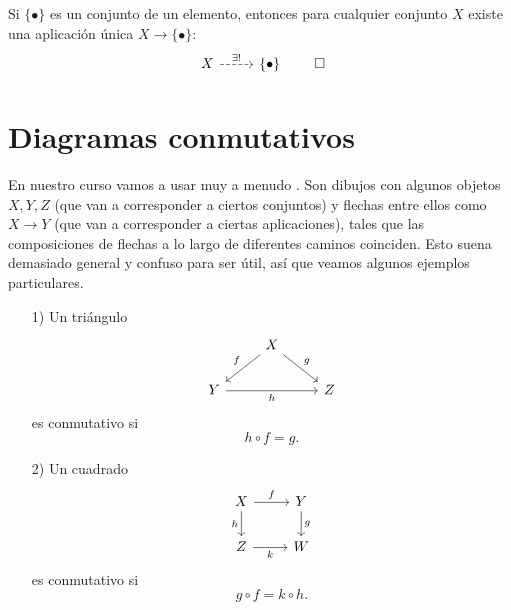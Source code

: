\begin{observacionejerc}
  \label{obs:propiedad-universal-de-singleton}
  Si $\{ \bullet \}$ es un conjunto de un elemento, entonces para cualquier
  conjunto $X$ existe una aplicación única $X \to \{ \bullet \}$:
  \[ \begin{tikzcd}
      X \ar[dashed]{r}{\exists !} & \{ \bullet \}
    \end{tikzcd} \qedhere \]
\end{observacionejerc}


\section{Diagramas conmutativos}

En nuestro curso vamos a usar muy a menudo .
Son dibujos con algunos objetos $X,Y,Z$ (que van a corresponder a ciertos
conjuntos) y flechas entre ellos como $X \to Y$ (que van a corresponder
a ciertas aplicaciones), tales que las composiciones de flechas a lo largo de
diferentes caminos coinciden. Esto suena demasiado general y confuso para ser
útil, así que veamos algunos ejemplos particulares.

\begin{enumerate}
\item[1)] Un triángulo
  $$\begin{tikzcd}
    & X\ar{dl}[swap]{f}\ar{dr}{g} \\
    Y\ar{rr}[swap]{h} & & Z
  \end{tikzcd}$$
  es conmutativo si
  $$h\circ f = g.$$
\end{enumerate}

\begin{enumerate}
\item[2)] Un cuadrado
  $$\begin{tikzcd}
    X\ar{r}{f}\ar{d}[swap]{h} & Y \ar{d}{g} \\
    Z\ar{r}[swap]{k} & W
  \end{tikzcd}$$
  es conmutativo si
  $$g\circ f = k\circ h.$$
\end{enumerate}

